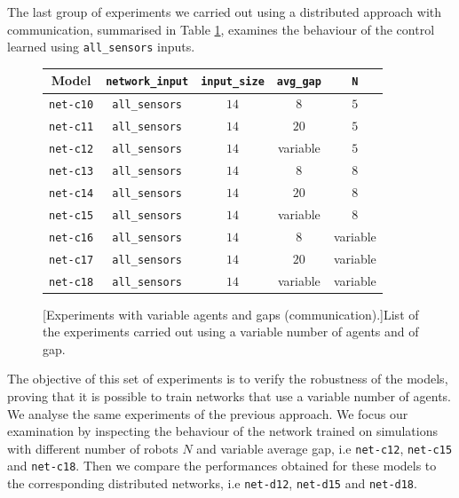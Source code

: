 The last group of experiments we carried out using a distributed approach with 
communication, summarised in Table \ref{tab:modelcomm}, examines the 
behaviour of the control learned using \texttt{all\_sensors} inputs. 
\begin{figure}[!htb]
	\centering
	\begin{tabular}{ccccc}
		\toprule
		\textbf{Model} \quad & \textbf{\texttt{network\_input}} & 
		\textbf{\texttt{input\_size}} & \textbf{\texttt{avg\_gap}} & \textbf{\texttt{N}}\\
		\midrule
		\texttt{net-c10} 	& \texttt{all\_sensors}		&  $14$  &  $8$		 	 &	 $5$ \\
		\texttt{net-c11} 	& \texttt{all\_sensors}		&  $14$  &  $20$		&	$5$ \\
		\texttt{net-c12} 	& \texttt{all\_sensors}		&  $14$  &  variable   &    $5$\\
		\texttt{net-c13} 	& \texttt{all\_sensors}	  	&  $14$  &  $8$			 &	  $8$ \\
		\texttt{net-c14} 	& \texttt{all\_sensors}	  	&  $14$  &  $20$   		&	 $8$ \\
		\texttt{net-c15} 	& \texttt{all\_sensors}	  	&  $14$  &  variable	&	 $8$ \\
		\texttt{net-c16} 	& \texttt{all\_sensors}	  	&  $14$  &  $ 8$		  &	 variable\\
		\texttt{net-c17} 	& \texttt{all\_sensors}	  	&  $14$  &  $20$		 &	variable\\
		\texttt{net-c18} 	& \texttt{all\_sensors}	  	&  $14$  &  variable	 &	
		variable\\
		\bottomrule
	\end{tabular}
	[Experiments with variable agents and gaps 
	(communication).]{List of the experiments carried out using a variable number 
		of agents and of gap.}
	\label{tab:modelcomm}
\end{figure}

The objective of this set of experiments is to verify the robustness of the models, 
proving that it is possible to train networks that use a variable number of agents.
We analyse the same experiments of the previous approach.
We focus our examination by inspecting the behaviour of the network trained on 
simulations with different number of robots $N$ and variable average gap, i.e 
\texttt{net-c12}, \texttt{net-c15} and \texttt{net-c18}. Then we compare 
the 
performances obtained for these models to the corresponding distributed 
networks, i.e \texttt{net-d12}, \texttt{net-d15} and \texttt{net-d18}.

